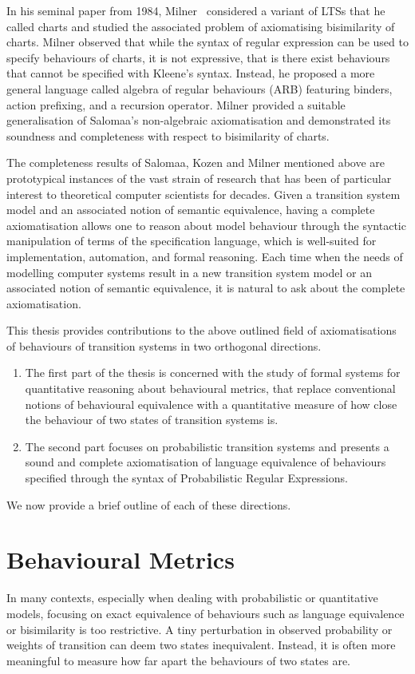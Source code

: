 In his seminal paper from 1984, Milner~\cite{Milner:1984:Complete} considered a variant of LTSs that he called charts and studied the associated problem of axiomatising bisimilarity of charts. Milner observed that while the syntax of regular expression can be used to specify behaviours of charts, it is not expressive, that is there exist behaviours that cannot be specified with Kleene's syntax. Instead, he proposed a more general language called algebra of regular behaviours (ARB) featuring binders, action prefixing, and a recursion operator. Milner provided a suitable generalisation of Salomaa's non-algebraic axiomatisation and demonstrated its soundness and completeness with respect to bisimilarity of charts.   

The completeness results of Salomaa, Kozen and Milner mentioned above are prototypical instances of the vast strain of research that has been of particular interest to theoretical computer scientists for decades. Given a transition system model and an associated notion of semantic equivalence, having a complete axiomatisation allows one to reason about model behaviour through the syntactic manipulation of terms of the specification language, which is well-suited for implementation, automation, and formal reasoning. Each time when the needs of modelling computer systems result in a new transition system model or an associated notion of semantic equivalence, it is natural to ask about the complete axiomatisation. 

This thesis provides contributions to the above outlined field of axiomatisations of behaviours of transition systems in two orthogonal directions.
\begin{enumerate}
	\item The first part of the thesis is concerned with the study of formal systems for quantitative reasoning about behavioural metrics, that replace conventional notions of behavioural equivalence with a quantitative measure of how close the behaviour of two states of transition systems is.
	\item The second part focuses on probabilistic transition systems and presents a sound and complete axiomatisation of language equivalence of behaviours specified through the syntax of Probabilistic Regular Expressions.
	\end{enumerate}	
We now provide a brief outline of each of these directions.
\section{Behavioural Metrics}
In many contexts, especially when dealing with probabilistic or quantitative models, focusing on exact equivalence of behaviours such as language equivalence or bisimilarity is too restrictive. A tiny perturbation in observed probability or weights of transition can deem two states inequivalent.  Instead, it is often more meaningful to measure how far apart the behaviours of two states are. 


